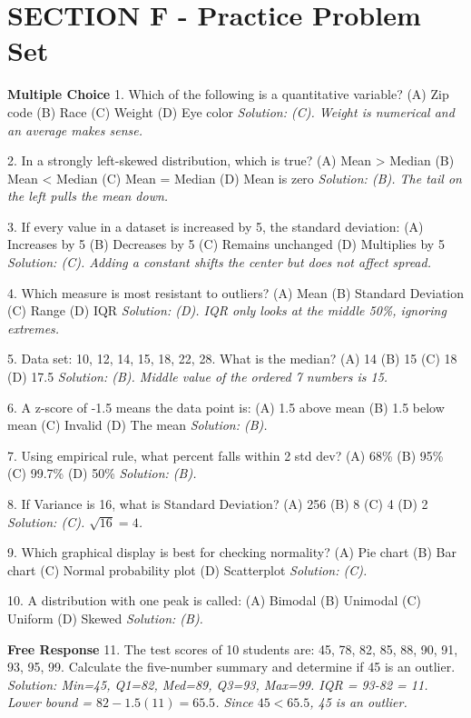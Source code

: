 \section{SECTION F - Practice Problem Set}
\begin{workbookbox}
\textbf{Multiple Choice}
1. Which of the following is a quantitative variable?
(A) Zip code (B) Race (C) Weight (D) Eye color
\textit{Solution: (C). Weight is numerical and an average makes sense.}

2. In a strongly left-skewed distribution, which is true?
(A) Mean > Median (B) Mean < Median (C) Mean = Median (D) Mean is zero
\textit{Solution: (B). The tail on the left pulls the mean down.}

3. If every value in a dataset is increased by 5, the standard deviation:
(A) Increases by 5 (B) Decreases by 5 (C) Remains unchanged (D) Multiplies by 5
\textit{Solution: (C). Adding a constant shifts the center but does not affect spread.}

4. Which measure is most resistant to outliers?
(A) Mean (B) Standard Deviation (C) Range (D) IQR
\textit{Solution: (D). IQR only looks at the middle 50\%, ignoring extremes.}

5. Data set: 10, 12, 14, 15, 18, 22, 28. What is the median?
(A) 14 (B) 15 (C) 18 (D) 17.5
\textit{Solution: (B). Middle value of the ordered 7 numbers is 15.}

6. A z-score of -1.5 means the data point is:
(A) 1.5 above mean (B) 1.5 below mean (C) Invalid (D) The mean
\textit{Solution: (B).}

7. Using empirical rule, what percent falls within 2 std dev?
(A) 68\% (B) 95\% (C) 99.7\% (D) 50\%
\textit{Solution: (B).}

8. If Variance is 16, what is Standard Deviation?
(A) 256 (B) 8 (C) 4 (D) 2
\textit{Solution: (C). $\sqrt{16} = 4$.}

9. Which graphical display is best for checking normality?
(A) Pie chart (B) Bar chart (C) Normal probability plot (D) Scatterplot
\textit{Solution: (C).}

10. A distribution with one peak is called:
(A) Bimodal (B) Unimodal (C) Uniform (D) Skewed
\textit{Solution: (B).}

\textbf{Free Response}
11. The test scores of 10 students are: 45, 78, 82, 85, 88, 90, 91, 93, 95, 99. Calculate the five-number summary and determine if 45 is an outlier.
\textit{Solution: Min=45, Q1=82, Med=89, Q3=93, Max=99. IQR = 93-82 = 11. Lower bound = $82 - 1.5(11) = 65.5$. Since $45 < 65.5$, 45 is an outlier.}


\end{workbookbox}
